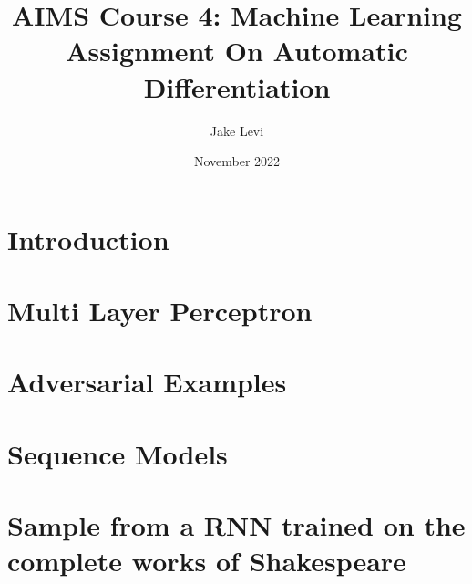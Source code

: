 \documentclass{article}
\title{
    AIMS Course 4: Machine Learning \\
    \large Assignment On Automatic Differentiation
}
\author{Jake Levi}
\date{November 2022}
\begin{document}
\maketitle
\section{Introduction} \label{section:intro}

\section{Multi Layer Perceptron}

\section{Adversarial Examples}

\section{Sequence Models}



\appendix
\section{Sample from a RNN trained on the complete works of Shakespeare}\label{appendix:rnn samples}


\end{document}
